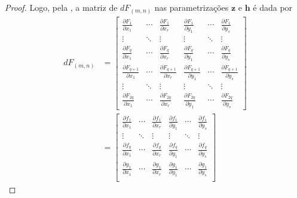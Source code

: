 \begin{lemma}
\begin{proof}
			Logo, pela , a matriz de $dF_{(m,n)}$ nas parametrizações $\mathbf{z}$ e $\mathbf{h}$ é dada por
			\begin{align*}
				dF_{(m,n)} & = \begin{bmatrix}
					               \frac{\partial F_1}{\partial x_1}     & \cdots & \frac{\partial F_1}{\partial x_r}     & \frac{\partial F_1}{\partial y_1}     & \cdots & \frac{\partial F_1}{\partial y_s}     \\
					               \vdots                                & \ddots & \vdots                                & \vdots                                & \ddots & \vdots                                \\
					               \frac{\partial F_q}{\partial x_1}     & \cdots & \frac{\partial F_q}{\partial x_r}     & \frac{\partial F_q}{\partial y_1}     & \cdots & \frac{\partial F_q}{\partial y_s}     \\
					               \frac{\partial F_{q+1}}{\partial x_1} & \cdots & \frac{\partial F_{q+1}}{\partial x_r} & \frac{\partial F_{q+1}}{\partial y_1} & \cdots & \frac{\partial F_{q+1}}{\partial y_s} \\
					               \vdots                                & \ddots & \vdots                                & \vdots                                & \ddots & \vdots                                \\
					               \frac{\partial F_{2q}}{\partial x_1}  & \cdots & \frac{\partial F_{2q}}{\partial x_r}  & \frac{\partial F_{2q}}{\partial y_1}  & \cdots & \frac{\partial F_{2q}}{\partial y_s}
				               \end{bmatrix} \\
				           & = \begin{bmatrix}
					               \frac{\partial f_1}{\partial x_1} & \cdots & \frac{\partial f_1}{\partial x_r} & \frac{\partial f_1}{\partial y_1} & \cdots & \frac{\partial f_1}{\partial y_s} \\
					               \vdots                            & \ddots & \vdots                            & \vdots                            & \ddots & \vdots                            \\
					               \frac{\partial f_q}{\partial x_1} & \cdots & \frac{\partial f_q}{\partial x_r} & \frac{\partial f_q}{\partial y_1} & \cdots & \frac{\partial f_q}{\partial y_s} \\
					               \frac{\partial g_1}{\partial x_1} & \cdots & \frac{\partial g_1}{\partial x_r} & \frac{\partial g_1}{\partial y_1} & \cdots & \frac{\partial g_1}{\partial y_s} \\

\end{bmatrix}
\end{align*}
\end{proof}
\end{lemma}

